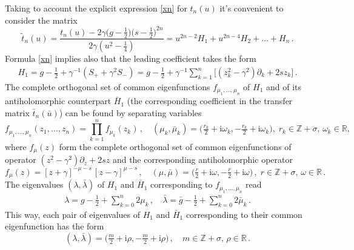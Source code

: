 \documentclass[a4paper,11pt]{article}
\renewcommand{\imath}{\mathrm{i}}
\numberwithin{equation}{section}
\begin{document}
Taking to account the explicit expression \eqref{xn} for $t_n(u)$ it's convenient to consider the matrix 
\begin{equation} \label{t_ren}
	\tilde{t}_n(u) = \frac{t_n(u) - 2\gamma\bigl(g-\frac{1}{2}\bigr)\bigl(s-\frac{1}{2}\bigr)^{2n}}{2\gamma (u^{2} - \frac{1}{4})} = u^{2n-2}H_1+u^{2n-4}H_2+\ldots+H_n \,.
\end{equation}
Formula \eqref{xn} implies also that the leading coefficient takes the form
\begin{align*}
	H_1 = g-\frac{1}{2} + \gamma^{-1}(S_+ + \gamma^2 S_-) = g-\frac{1}{2} + \gamma^{-1}\sum\limits_{k = 1}^n \bigl[(z_k^2-\gamma^2)\partial_k + 2sz_k\bigr] \,.
\end{align*}
The complete orthogonal set of common eigenfunctions $f_{\mu_1,\dots,\mu_n}$ of $H_1$ and of its antiholomorphic counterpart $\bar{H}_1$ (the corresponding coefficient in the transfer matrix $\bar{t}_n(\bar{u})$) can be found by separating variables
\begin{equation} \nonumber
	f_{\mu_1,\dots,\mu_n}(z_1,\dots,z_n) = \prod_{k = 1}^n f_{\mu_k}(z_k) \,, \quad
	(\mu_k,\bar{\mu}_k)=\bigl(\tfrac{r_k}{2}+\imath\omega_k, -\tfrac{r_k}{2}+\imath\omega_k\bigr), \; r_k\in\mathbb{Z}+\sigma,\,\omega_k\in\mathbb{R},
\end{equation}
where $f_\mu(z)$ form the complete orthogonal set of common eigenfunctions of operator $(z^2-\gamma^2)\partial_z + 2sz$ and the corresponding antiholomorphic operator
\begin{equation} \nonumber
	f_{\mu}(z) = [z+\gamma]^{-\mu-s}\,[z-\gamma]^{\mu-s} \,, \quad
	(\mu,\bar{\mu})=\bigl(\tfrac{r}{2}+\imath\omega, -\tfrac{r}{2}+\imath\omega\bigr)\,, \;
	r\in\mathbb{Z}+\sigma,\,\omega\in\mathbb{R} \,.
\end{equation}
The eigenvalues $(\lambda,\bar{\lambda})$ of $H_1$ and $\bar{H}_1$ corresponding to $f_{\mu_1,\dots,\mu_n}$ read
\begin{align*}
	\lambda = g-\frac{1}{2} + \sum \limits_{k = 0}^n 2\mu_k \,, \quad
	\bar{\lambda} = \bar{g}-\frac{1}{2} + \sum \limits_{k = 0}^n 2\bar{\mu}_k \,.
\end{align*}
This way, each pair of eigenvalues of $H_1$ and $\bar{H}_1$ corresponding to their common eigenfunction has the form
\begin{equation} \label{lambdaPar}
	(\lambda,\bar{\lambda}) = \bigl(\tfrac{m}{2}+\imath\rho, -\tfrac{m}{2}+\imath\rho\bigr)\,, \quad
	m\in\mathbb{Z}+\sigma,\,\rho\in\mathbb{R} \,.
\end{equation}
\end{document}
